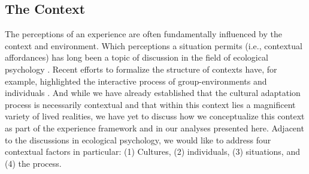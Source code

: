 \documentclass[man, 12pt, a4paper]{apa7}
\begin{document}
\subsection{The Context}
The perceptions of an experience are often fundamentally influenced by the context and environment. Which perceptions a situation permits (i.e., contextual affordances) has long been a topic of discussion in the field of ecological psychology \citep[e.g.,][]{Cantor1994}. Recent efforts to formalize the structure of contexts have, for example, highlighted the interactive process of group-environments and individuals \citep[e.g.,][]{Young2002}.
And while we have already established that the cultural adaptation process is necessarily contextual and that within this context lies a magnificent variety of lived realities, we have yet to discuss how we conceptualize this context as part of the experience framework and in our analyses presented here. 
Adjacent to the discussions in ecological psychology, we would like to address four contextual factors in particular: (1) Cultures, (2) individuals, (3) situations, and (4) the process.
\end{document}

